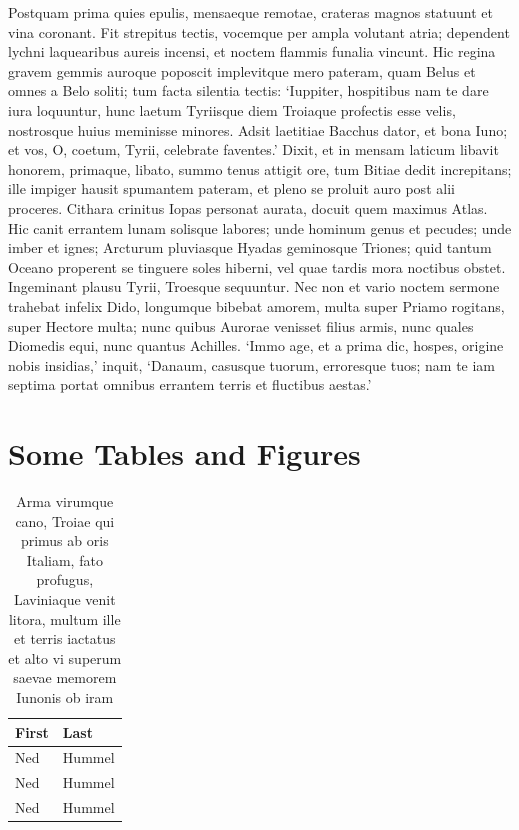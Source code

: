 \documentclass[ms,testing]{nuthesis}
\begin{document}
Postquam prima quies epulis, mensaeque remotae, crateras magnos
statuunt et vina coronant.  Fit strepitus tectis, vocemque per ampla
volutant atria; dependent lychni laquearibus aureis incensi, et noctem
flammis funalia vincunt.  Hic regina gravem gemmis auroque poposcit
implevitque mero pateram, quam Belus et omnes a Belo soliti; tum facta
silentia tectis: `Iuppiter, hospitibus nam te dare iura loquuntur,
hunc laetum Tyriisque diem Troiaque profectis esse velis, nostrosque
huius meminisse minores.  Adsit laetitiae Bacchus dator, et bona Iuno;
et vos, O, coetum, Tyrii, celebrate faventes.'  Dixit, et in mensam
laticum libavit honorem, primaque, libato, summo tenus attigit ore,
tum Bitiae dedit increpitans; ille impiger hausit spumantem pateram,
et pleno se proluit auro post alii proceres.  Cithara crinitus Iopas
personat aurata, docuit quem maximus Atlas.  Hic canit errantem lunam
solisque labores; unde hominum genus et pecudes; unde imber et ignes;
Arcturum pluviasque Hyadas geminosque Triones; quid tantum Oceano
properent se tinguere soles hiberni, vel quae tardis mora noctibus
obstet.  Ingeminant plausu Tyrii, Troesque sequuntur.  Nec non et
vario noctem sermone trahebat infelix Dido, longumque bibebat amorem,
multa super Priamo rogitans, super Hectore multa; nunc quibus Aurorae
venisset filius armis, nunc quales Diomedis equi, nunc quantus
Achilles.  `Immo age, et a prima dic, hospes, origine nobis insidias,'
inquit, `Danaum, casusque tuorum, erroresque tuos; nam te iam septima
portat omnibus errantem terris et fluctibus aestas.'\cite{virgil}

\chapter{Some Tables and Figures}

\begin{table}[h]
  \centering
  \begin{tabular}{ll}\toprule
    First & Last \\ \midrule
    Ned & Hummel \\
    Ned & Hummel \\
    Ned & Hummel \\ \bottomrule
  \end{tabular}
  \caption{Arma virumque cano, Troiae qui primus ab oris Italiam, fato profugus,
Laviniaque venit litora, multum ille et terris iactatus et alto vi
superum saevae memorem Iunonis ob iram}
  \label{tab:tabular}
\end{table}
\end{document}
